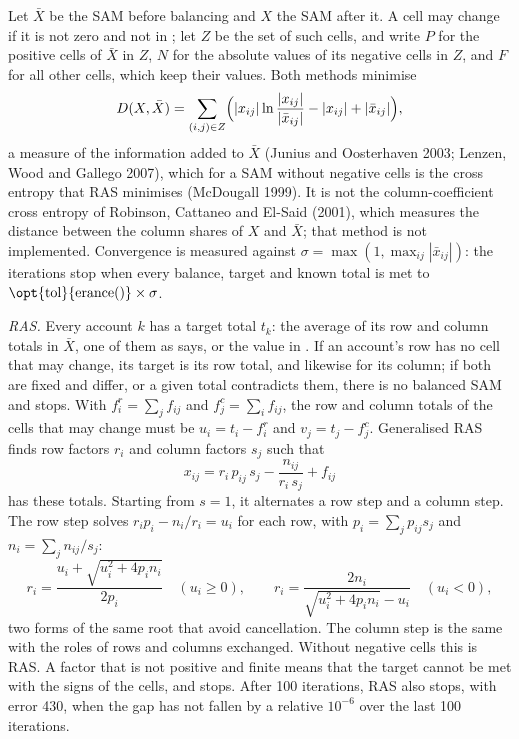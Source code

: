 
Let $\bar X$ be the SAM before balancing and $X$ the SAM after it. A cell may
change if it is not zero and not in ; let $Z$ be the set of such
cells, and write $P$ for the positive cells of $\bar X$ in $Z$, $N$ for the
absolute values of its negative cells in $Z$, and $F$ for all other cells,
which keep their values. Both methods minimise
\begin{equation*}
D(X, \bar X) = \sum_{(i,j) \in Z} \Bigl( |x_{ij}| \ln \frac{|x_{ij}|}{|\bar x_{ij}|} - |x_{ij}| + |\bar x_{ij}| \Bigr),
\end{equation*}
a measure of the information added to $\bar X$ (Junius and Oosterhaven 2003;
Lenzen, Wood and Gallego 2007), which for a SAM without negative cells is the
cross entropy that RAS minimises (McDougall 1999). It is not the
column-coefficient cross entropy of Robinson, Cattaneo and El-Said (2001),
which measures the distance between the column shares of $X$ and $\bar X$;
that method is not implemented. Convergence is measured against
$\sigma = \max(1, \max_{ij} |\bar x_{ij}|)$: the iterations stop when every
balance, target and known total is met to $\text{\opt{tol}{erance()}} \times
\sigma$.

\textit{RAS.} Every account $k$ has a target total $t_k$: the average of its
row and column totals in $\bar X$, one of them as  says, or
the value in . If an account's row has no cell that may change,
its target is its row total, and likewise for its column; if both are fixed and
differ, or a given total contradicts them, there is no balanced SAM and
 stops. With $f^r_i = \sum_j f_{ij}$ and $f^c_j = \sum_i
f_{ij}$, the row and column totals of the cells that may change must be $u_i =
t_i - f^r_i$ and $v_j = t_j - f^c_j$. Generalised RAS finds row factors $r_i$
and column factors $s_j$ such that
\begin{equation*}
x_{ij} = r_i\, p_{ij}\, s_j - \frac{n_{ij}}{r_i\, s_j} + f_{ij}
\end{equation*}
has these totals. Starting from $s = 1$, it alternates a row step and a column
step. The row step solves $r_i p_i - n_i / r_i = u_i$ for each row, with
$p_i = \sum_j p_{ij} s_j$ and $n_i = \sum_j n_{ij} / s_j$:
\begin{equation*}
r_i = \frac{u_i + \sqrt{u_i^2 + 4 p_i n_i}}{2 p_i} \quad (u_i \ge 0), \qquad
r_i = \frac{2 n_i}{\sqrt{u_i^2 + 4 p_i n_i} - u_i} \quad (u_i < 0),
\end{equation*}
two forms of the same root that avoid cancellation. The column step is the
same with the roles of rows and columns exchanged. Without negative cells
this is RAS. A factor that is not positive and finite means that the target
cannot be met with the signs of the cells, and  stops. After
100 iterations, RAS also stops, with error 430, when the gap has not fallen by
a relative $10^{-6}$ over the last 100 iterations.

